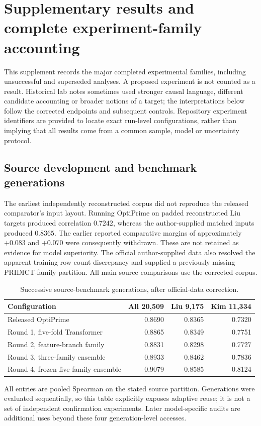 \section{Supplementary results and complete experiment-family accounting}
This supplement records the major completed experimental families, including unsuccessful and superseded analyses. A proposed experiment is not counted as a result. Historical lab notes sometimes used stronger causal language, different candidate accounting or broader notions of a target; the interpretations below follow the corrected endpoints and subsequent controls. Repository experiment identifiers are provided to locate exact run-level configurations, rather than implying that all results come from a common sample, model or uncertainty protocol.

\subsection{Source development and benchmark generations}
The earliest independently reconstructed corpus did not reproduce the released comparator's input layout. Running OptiPrime on padded reconstructed Liu targets produced correlation $0.7242$, whereas the author-supplied matched inputs produced $0.8365$. The earlier reported comparative margins of approximately $+0.083$ and $+0.070$ were consequently withdrawn. These are not retained as evidence for model superiority. The official author-supplied data also resolved the apparent training-row-count discrepancy and supplied a previously missing PRIDICT-family partition. All main source comparisons use the corrected corpus.

\begin{table}[htbp]
\centering\small
\caption{Successive source-benchmark generations, after official-data correction.}
\label{tab:generations}
\begin{tabular}{lrrr}
\toprule
Configuration & All 20,509 & Liu 9,175 & Kim 11,334 \\
\midrule
Released OptiPrime & 0.8690 & 0.8365 & 0.7320 \\
Round 1, five-fold Transformer & 0.8865 & 0.8349 & 0.7751 \\
Round 2, feature-branch family & 0.8831 & 0.8298 & 0.7727 \\
Round 3, three-family ensemble & 0.8933 & 0.8462 & 0.7836 \\
Round 4, frozen five-family ensemble & 0.9079 & 0.8585 & 0.8124 \\
\bottomrule
\end{tabular}
\par\smallskip\begin{minipage}{\linewidth}\footnotesize
All entries are pooled Spearman on the stated source partition. Generations were evaluated sequentially, so this table explicitly exposes adaptive reuse; it is not a set of independent confirmation experiments. Later model-specific audits are additional uses beyond these four generation-level accesses.
\end{minipage}
\end{table}

